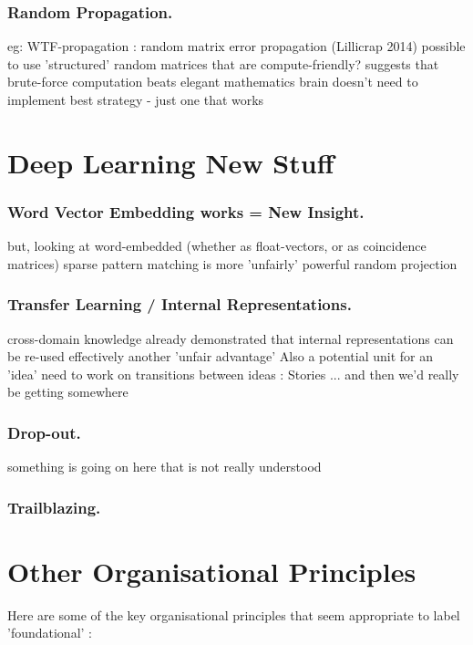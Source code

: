 \documentclass[citeauthoryear]{llncs}
\begin{document}
\subsubsection*{Random Propagation.}
    eg: WTF-propagation : random matrix error propagation (Lillicrap 2014)
      possible to use 'structured' random matrices that are compute-friendly?
      suggests that brute-force computation beats elegant mathematics
        brain doesn't need to implement best strategy - just one that works

 
\section{Deep Learning New Stuff}


\subsubsection*{Word Vector Embedding works = New Insight.}
    but, looking at word-embedded (whether as float-vectors, or as coincidence matrices)
      sparse pattern matching is more 'unfairly' powerful 
      random projection

\subsubsection*{Transfer Learning / Internal Representations.}
  cross-domain knowledge
    already demonstrated that internal representations can be re-used effectively
    another 'unfair advantage'
  Also a potential unit for an 'idea'
    need to work on transitions between ideas : Stories
      ... and then we'd really be getting somewhere


\subsubsection*{Drop-out.}
    something is going on here that is not really understood

\subsubsection*{Trailblazing.}


\section{Other Organisational Principles}

Here are some of the key organisational principles that seem appropriate to label 'foundational' :
\end{document}
